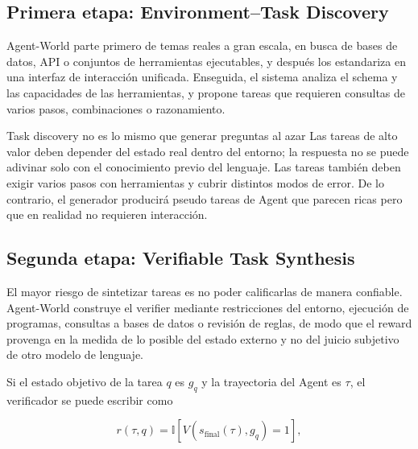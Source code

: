 \subsection{Primera etapa: Environment--Task Discovery}

Agent-World parte primero de temas reales a gran escala, en busca de bases de datos, API o conjuntos de herramientas ejecutables, y después los estandariza en una interfaz de interacción unificada. Enseguida, el sistema analiza el schema y las capacidades de las herramientas, y propone tareas que requieren consultas de varios pasos, combinaciones o razonamiento.


\begin{knowledgebox}{Task discovery no es lo mismo que generar preguntas al azar}
Las tareas de alto valor deben depender del estado real dentro del entorno; la respuesta no se puede adivinar solo con el conocimiento previo del lenguaje. Las tareas también deben exigir varios pasos con herramientas y cubrir distintos modos de error. De lo contrario, el generador producirá pseudo tareas de Agent que parecen ricas pero que en realidad no requieren interacción.
\end{knowledgebox}

\subsection{Segunda etapa: Verifiable Task Synthesis}

El mayor riesgo de sintetizar tareas es no poder calificarlas de manera confiable. Agent-World construye el verifier mediante restricciones del entorno, ejecución de programas, consultas a bases de datos o revisión de reglas, de modo que el reward provenga en la medida de lo posible del estado externo y no del juicio subjetivo de otro modelo de lenguaje.


Si el estado objetivo de la tarea $q$ es $g_q$ y la trayectoria del Agent es $\tau$, el verificador se puede escribir como

$$
r(\tau,q)=\mathbb{I}\!\left[V\!\left(s_{\mathrm{final}}(\tau),g_q\right)=1\right],
$$

